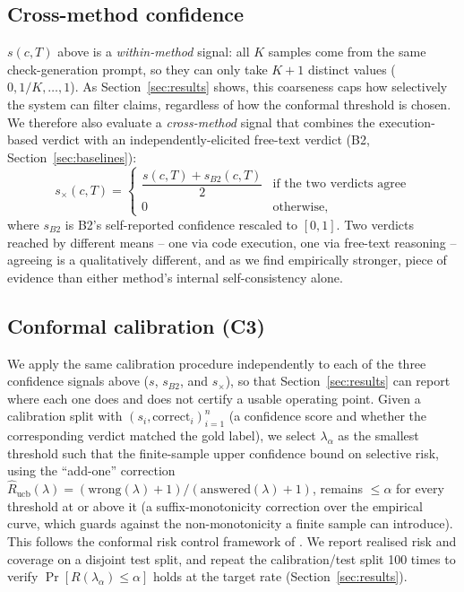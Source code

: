 \documentclass[journal]{IEEEtran}
\begin{document}
\subsection{Cross-method confidence}
\label{sec:cross-method}
$s(c,T)$ above is a \emph{within-method} signal: all $K$ samples come from
the same check-generation prompt, so they can only take $K+1$ distinct
values ($0, 1/K, \ldots, 1$). As Section~\ref{sec:results} shows, this
coarseness caps how selectively the system can filter claims, regardless of
how the conformal threshold is chosen. We therefore also evaluate a
\emph{cross-method} signal that combines the execution-based verdict with an
independently-elicited free-text verdict (B2, Section~\ref{sec:baselines}):
\begin{equation}
s_{\times}(c,T) = \begin{cases}
\dfrac{s(c,T) + s_{B2}(c,T)}{2} & \text{if the two verdicts agree} \\[4pt]
0 & \text{otherwise,}
\end{cases}
\end{equation}
where $s_{B2}$ is B2's self-reported confidence rescaled to $[0,1]$. Two
verdicts reached by different means -- one via code execution, one via
free-text reasoning -- agreeing is a qualitatively different, and as we find
empirically stronger, piece of evidence than either method's internal
self-consistency alone.

\subsection{Conformal calibration (C3)}
We apply the same calibration procedure independently to each of the three
confidence signals above ($s$, $s_{B2}$, and $s_\times$), so that
Section~\ref{sec:results} can report where each one does and does not
certify a usable operating point. Given a calibration split with
$(s_i, \text{correct}_i)_{i=1}^n$ (a confidence score and whether the
corresponding verdict matched the gold label), we select
$\lambda_\alpha$ as the smallest threshold such that the finite-sample
upper confidence bound on selective risk, using the ``add-one'' correction
$\widehat R_{\text{ucb}}(\lambda) = (\text{wrong}(\lambda)+1)/
(\text{answered}(\lambda)+1)$, remains $\le\alpha$ for every threshold at or
above it (a suffix-monotonicity correction over the empirical curve, which
guards against the non-monotonicity a finite sample can introduce). This
follows the conformal risk control framework of
\cite{angelopoulos2024risk}. We report realised risk and coverage on a
disjoint test split, and repeat the calibration/test split 100 times to
verify $\Pr[R(\lambda_\alpha)\le\alpha]$ holds at the target rate
(Section~\ref{sec:results}).
\end{document}

